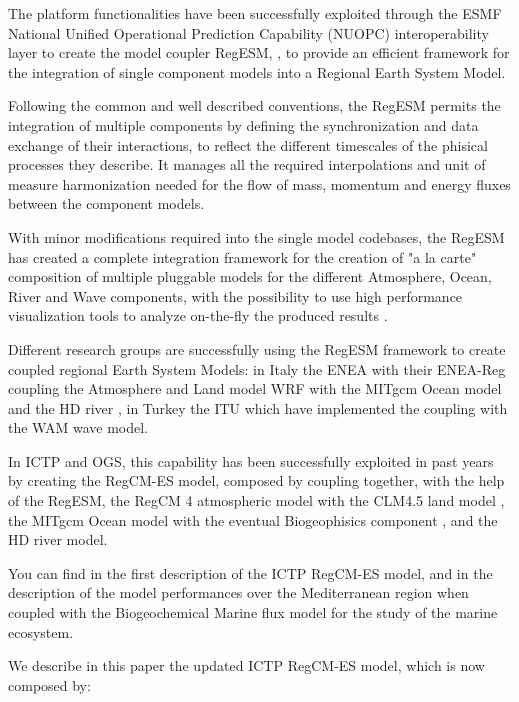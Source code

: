 \documentclass[journal abbreviation, manuscript]{copernicus}
\begin{document}
The platform functionalities have been successfully exploited through the
ESMF National Unified Operational Prediction Capability (NUOPC)
interoperability layer to create the model coupler RegESM,
\citep{ufuk-gmd-2013,ufuk-cd-2017}, to provide an efficient framework for
the integration of single component models into a Regional Earth System Model.

Following the common and well described conventions, the RegESM permits the
integration of multiple components by defining the synchronization and data
exchange of their interactions, to reflect the different timescales of the
phisical processes they describe. It manages all the required interpolations
and unit of measure harmonization needed for the flow of mass, momentum and
energy fluxes between the component models.

With minor modifications required into the single model codebases, the
RegESM has created a complete integration framework for the creation of
"a la carte" composition of multiple pluggable models for
the different Atmosphere, Ocean, River and Wave components, with the
possibility to use high performance visualization tools
to analyze on-the-fly the produced results \citep{ufuk-gmd-2019}.

Different research groups are successfully using the RegESM framework to
create coupled regional Earth System Models: in Italy the ENEA with their
ENEA-Reg \citep{anav-gmd-2021} coupling the Atmosphere and Land model
WRF \citep{wrf-2017} with the MITgcm Ocean model
\citep{marshall-1997,adcroft-2004} and the HD river \citep{hagemann-1997},
in Turkey the ITU \citep{batibeniz-2025} which have implemented
the coupling with the WAM \citep{wamdi-1988} wave model.

In ICTP and OGS, this capability has been successfully exploited in past years
by creating the RegCM-ES model, composed by coupling together, with the help
of the RegESM, the RegCM 4 atmospheric model with the CLM4.5 land model
\citep{giorgi-2012,oleson-2013}, the MITgcm Ocean model with
the eventual Biogeophisics component \citep{cossarini-gmd-2017},
and the HD river model.

You can find in \citet{sitz-2017} the first description of the ICTP RegCM-ES
model, and in \citet{reale-2020} the description of the model performances over
the Mediterranean region when coupled with the Biogeochemical Marine flux
model for the study of the marine ecosystem.

We describe in this paper the updated ICTP RegCM-ES model, which is now
composed by:
\end{document}
